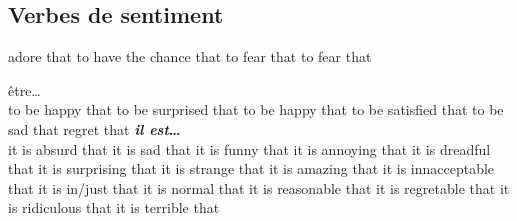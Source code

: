 \subsection*{Verbes de sentiment}

   {adore that}
   {to have the chance that}
   {to fear that}
   {to fear that}

être\ldots\\
   {to be happy that}
   {to be surprised that}
   {to be happy that}
   {to be satisfied that}
   {to be sad that}
   {regret that}
     {\bf {\em il est}\ldots}\\
        {it is absurd that}
        {it is sad that}
        {it is funny that}
        {it is annoying that}
        {it is dreadful that}
        {it is surprising that}
        {it is strange that}
        {it is amazing that}
        {it is innacceptable that}
        {it is in/just that}
        {it is normal that}
        {it is reasonable that}
        {it is regretable that}
        {it is ridiculous that}
        {it is terrible that}
